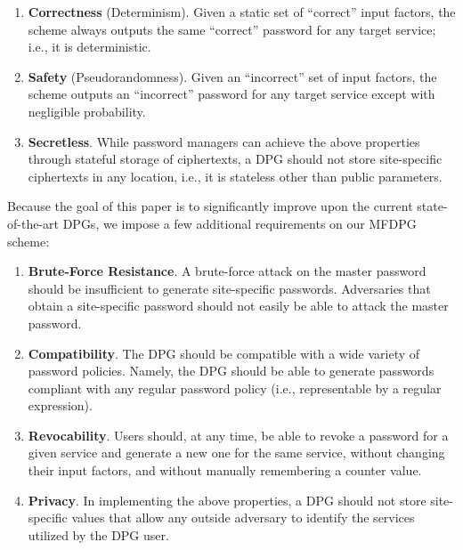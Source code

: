 \begin{enumerate}[leftmargin=*]
    \itemsep 1em
    \item \textbf{Correctness} (Determinism). Given a static set of ``correct'' input factors, the scheme always outputs the same ``correct'' password for any target service; i.e., it is deterministic. 
    \item \textbf{Safety} (Pseudorandomness). Given an ``incorrect'' set of input factors, the scheme outputs an ``incorrect'' password for any target service except with negligible probability. 
    \item \textbf{Secretless}. While password managers can achieve the above properties through stateful storage of ciphertexts, a DPG should not store site-specific ciphertexts in any location, i.e., it is stateless other than public parameters.
\end{enumerate}

Because the goal of this paper is to significantly improve upon the current state-of-the-art DPGs, we impose a few additional requirements on our MFDPG scheme:

\begin{enumerate}[resume,leftmargin=*]
    \itemsep 1em
    \item \textbf{Brute-Force Resistance}. A brute-force attack on the master password should be insufficient to generate site-specific passwords. Adversaries that obtain a site-specific password should not easily be able to attack the master password.
    \item \textbf{Compatibility}. The DPG should be compatible with a wide variety of password policies. Namely, the DPG should be able to generate passwords compliant with any regular password policy (i.e., representable by a regular expression).
    \item \textbf{Revocability}. Users should, at any time, be able to revoke a password for a given service and generate a new one for the same service, without changing their input factors, and without manually remembering a counter value.
    \item \textbf{Privacy}. In implementing the above properties, a DPG should not store site-specific values that allow any outside adversary to identify the services utilized by the DPG user.
\end{enumerate}

\eject